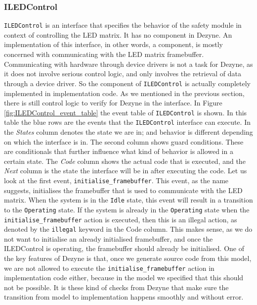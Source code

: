 \documentclass[12pt]{scrreprt}
\begin{document}
\subsubsection{ILEDControl}
\texttt{ILEDControl} is an interface that specifies the behavior of the safety module in context of controlling the LED matrix. It has no component in Dezyne. An implementation of this interface, in other words, a component, is mostly concerned with communicating with the LED matrix framebuffer. Communicating with hardware through device drivers is not a task for Dezyne, as it does not involve serious control logic, and only involves the retrieval of data through a device driver. So the component of \texttt{ILEDControl} is actually completely implemented in implementation code. As we mentioned in the previous section, there is still control logic to verify for Dezyne in the interface. In Figure \ref{fig:ILEDControl_event_table} the event table of \texttt{ILEDControl} is shown. In this table the blue rows are the events that the \texttt{ILEDControl} interface can execute. In the \textit{States} column denotes the state we are in; and behavior is different depending on which the interface is in. The second column shows guard conditions. These are conditionals that further influence what kind of behavior is allowed in a certain state. The \textit{Code} column shows the actual code that is executed, and the \textit{Next} column is the state the interface will be in after executing the code. Let us look at the first event, \texttt{initialise\_framebuffer}. This event, as the name suggests, initialises the framebuffer that is used to communicate with the LED matrix. When the system is in the \texttt{Idle} state, this event will result in a transition to the \texttt{Operating} state. If the system is already in the \texttt{Operating} state when the \texttt{initialise\_framebuffer} action is executed, then this is an illegal action, as denoted by the \texttt{illegal} keyword in the Code column. This makes sense, as we do not want to initialise an already initialised framebuffer, and once the ILEDControl is operating, the framebuffer should already be initialised. One of the key features of Dezyne is that, once we generate source code from this model, we are not allowed to execute the \texttt{initialise\_framebuffer} action in implementation code either, because in the model we specified that this should not be possible. It is these kind of checks from Dezyne that make sure the transition from model to implementation happens smoothly and without error. \par
\end{document}

